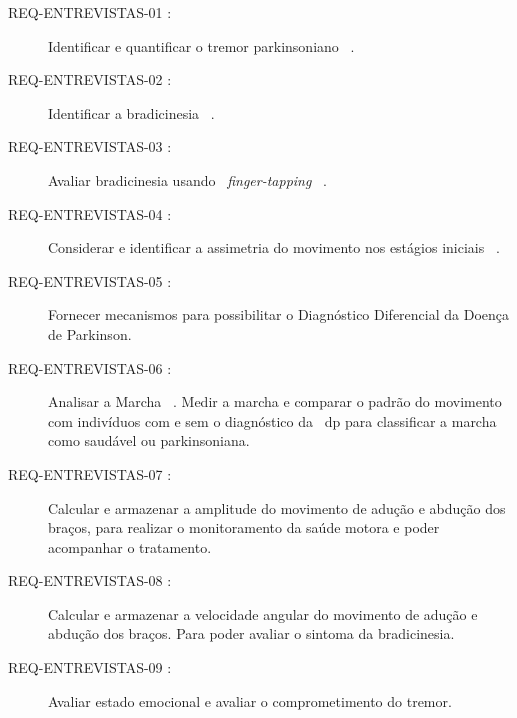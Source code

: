 \begin{description}
	\item[REQ-ENTREVISTAS-01 :] Identificar e quantificar o tremor parkinsoniano ~\cite{tolosa06,keijsers2006,lemoyne2010}.
	\item[REQ-ENTREVISTAS-02 :] Identificar a bradicinesia ~\cite{patel_monitoring_2009}. %
	\item[REQ-ENTREVISTAS-03 :] Avaliar bradicinesia usando ~\textit{finger-tapping} ~\cite{finger2012}.
	\item[REQ-ENTREVISTAS-04 :] Considerar e identificar a assimetria do movimento nos estágios iniciais ~\cite{national2006parkinson}.	%
	\item[REQ-ENTREVISTAS-05 :] Fornecer mecanismos para possibilitar o Diagnóstico Diferencial \cite{protpar010} da Doença de Parkinson. %
	\item[REQ-ENTREVISTAS-06 :] Analisar a Marcha ~\cite{gaitusingsensorsreview2012}. Medir a marcha e comparar o padrão do movimento com indivíduos com e sem o diagnóstico da ~\ac{dp} para classificar a marcha como saudável ou parkinsoniana.
	\item[REQ-ENTREVISTAS-07 :] Calcular e armazenar a amplitude do movimento de adução e abdução dos braços, para realizar o monitoramento da saúde motora e poder acompanhar o tratamento.
	\item[REQ-ENTREVISTAS-08 :] Calcular e armazenar a velocidade angular do movimento de adução e abdução dos braços. Para poder avaliar o sintoma da bradicinesia.
	\item[REQ-ENTREVISTAS-09 :] Avaliar estado emocional e avaliar o comprometimento do tremor. 
\end{description}



